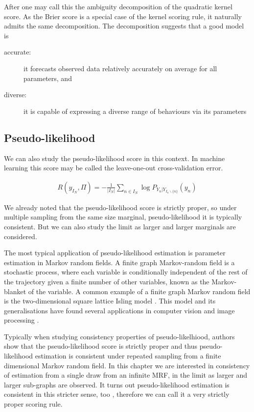 After \cite{} one may call this the ambiguity decomposition of the quadratic kernel score. As the Brier score is a special case of the kernel scoring rule, it naturally admits the same decomposition. The decomposition suggests that a good model is
\begin{description}
	\item[accurate:] it forecasts observed data relatively accurately on average for all parameters, and
	\item[diverse:] it is capable of expressing a diverse range of behaviours via its parameters
\end{description}

\subsection{Pseudo-likelihood}

We can also study the pseudo-likelihood score in this context. In machine learning this score may be called the leave-one-out cross-validation error.

\begin{align}
R(y_{I_N},\Pi) = - \frac{1}{\vert I_N \vert} \sum_{n\in{I_N}}\log P_{Y_n\vert Y_{I_n\backslash\{n\}}}(y_n)
\end{align}

We already noted that the pseudo-likelihood score is strictly proper, so under multiple sampling from the same size marginal, pseudo-likelihood it is typically consistent. But we can also study the limit as larger and larger marginals are considered.

The most typical application of pseudo-likelihood estimation is parameter estimation in Markov random fields. A finite graph Markov-random field is a stochastic process, where each variable is conditionally independent of the rest of the trajectory given a finite number of other variables, known as the Markov-blanket of the variable. A common example of a finite graph Markov random field is the two-dimensional square lattice Isling model \cite{Dawid's paper}. This model and its generalisations have found several applications in computer vision and image processing \cite{}.
 
Typically when studying consistency properties of pseudo-likelhiood, authors show that the pseudo-likelihood score is strictly proper and thus pseudo-likelihood estimation is consistent under repeated sampling from a finite dimensional Markov random field. In this chapter we are interested in consistency of estimation from a single draw from an infinite MRF, in the limit as larger and larger sub-graphs are observed. It turns out pseudo-likelihood estimation is consistent in this stricter sense, too \cite{GemanGraffigne}, therefore we can call it a very strictly proper scoring rule.


